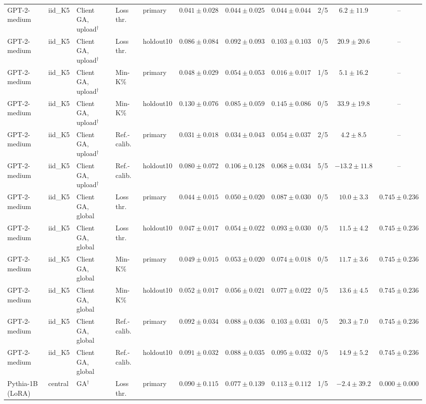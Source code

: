 \begin{table}[t]
\begin{tabular*}{\textwidth}{@{\extracolsep{\fill}}lllllcccccc@{}}
GPT-2-medium & iid\_K5 & Client GA, upload$^{\dagger}$ & Loss thr. & primary & $0.041 \pm 0.028$ & $0.044 \pm 0.025$ & $0.044 \pm 0.044$ & 2/5 & $6.2 \pm 11.9$ & -- \\
GPT-2-medium & iid\_K5 & Client GA, upload$^{\dagger}$ & Loss thr. & holdout10 & $0.086 \pm 0.084$ & $0.092 \pm 0.093$ & $0.103 \pm 0.103$ & 0/5 & $20.9 \pm 20.6$ & -- \\
GPT-2-medium & iid\_K5 & Client GA, upload$^{\dagger}$ & Min-K\% & primary & $0.048 \pm 0.029$ & $0.054 \pm 0.053$ & $0.016 \pm 0.017$ & 1/5 & $5.1 \pm 16.2$ & -- \\
GPT-2-medium & iid\_K5 & Client GA, upload$^{\dagger}$ & Min-K\% & holdout10 & $0.130 \pm 0.076$ & $0.085 \pm 0.059$ & $0.145 \pm 0.086$ & 0/5 & $33.9 \pm 19.8$ & -- \\
GPT-2-medium & iid\_K5 & Client GA, upload$^{\dagger}$ & Ref.-calib. & primary & $0.031 \pm 0.018$ & $0.034 \pm 0.043$ & $0.054 \pm 0.037$ & 2/5 & $4.2 \pm 8.5$ & -- \\
GPT-2-medium & iid\_K5 & Client GA, upload$^{\dagger}$ & Ref.-calib. & holdout10 & $0.080 \pm 0.072$ & $0.106 \pm 0.128$ & $0.068 \pm 0.034$ & 5/5 & $-13.2 \pm 11.8$ & -- \\
GPT-2-medium & iid\_K5 & Client GA, global & Loss thr. & primary & $0.044 \pm 0.015$ & $0.050 \pm 0.020$ & $0.087 \pm 0.030$ & 0/5 & $10.0 \pm 3.3$ & $0.745 \pm 0.236$ \\
GPT-2-medium & iid\_K5 & Client GA, global & Loss thr. & holdout10 & $0.047 \pm 0.017$ & $0.054 \pm 0.022$ & $0.093 \pm 0.030$ & 0/5 & $11.5 \pm 4.2$ & $0.745 \pm 0.236$ \\
GPT-2-medium & iid\_K5 & Client GA, global & Min-K\% & primary & $0.049 \pm 0.015$ & $0.053 \pm 0.020$ & $0.074 \pm 0.018$ & 0/5 & $11.7 \pm 3.6$ & $0.745 \pm 0.236$ \\
GPT-2-medium & iid\_K5 & Client GA, global & Min-K\% & holdout10 & $0.052 \pm 0.017$ & $0.056 \pm 0.021$ & $0.077 \pm 0.022$ & 0/5 & $13.6 \pm 4.5$ & $0.745 \pm 0.236$ \\
GPT-2-medium & iid\_K5 & Client GA, global & Ref.-calib. & primary & $0.092 \pm 0.034$ & $0.088 \pm 0.036$ & $0.103 \pm 0.031$ & 0/5 & $20.3 \pm 7.0$ & $0.745 \pm 0.236$ \\
GPT-2-medium & iid\_K5 & Client GA, global & Ref.-calib. & holdout10 & $0.091 \pm 0.032$ & $0.088 \pm 0.035$ & $0.095 \pm 0.032$ & 0/5 & $14.9 \pm 5.2$ & $0.745 \pm 0.236$ \\
Pythia-1B (LoRA) & central & GA$^{\dagger}$ & Loss thr. & primary & $0.090 \pm 0.115$ & $0.077 \pm 0.139$ & $0.113 \pm 0.112$ & 1/5 & $-2.4 \pm 39.2$ & $0.000 \pm 0.000$ \\

\end{tabular*}
\end{table}
